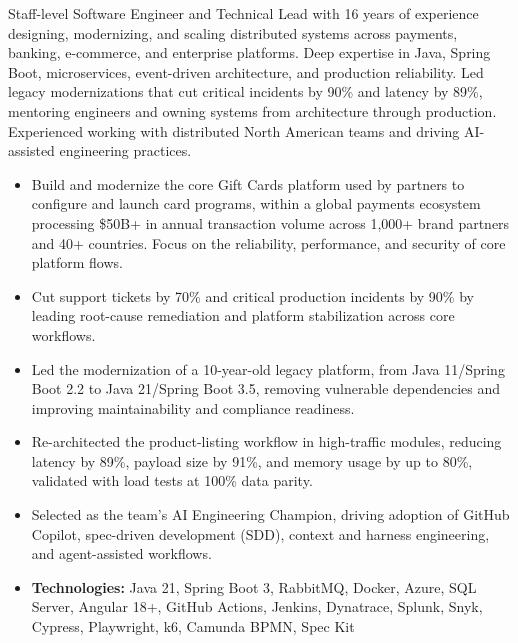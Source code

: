 \documentclass[10pt,a4paper,normalphoto]{altacv}
\newcommand{\techline}[1]{\vspace{3pt}\item[--]{\footnotesize\linespread{0.92}\selectfont \textbf{Technologies:} #1}}
\begin{document}

\makecvheader


Staff-level Software Engineer and Technical Lead with 16 years of experience designing, modernizing, and scaling distributed systems across payments, banking, e-commerce, and enterprise platforms. Deep expertise in Java, Spring Boot, microservices, event-driven architecture, and production reliability. Led legacy modernizations that cut critical incidents by 90\% and latency by 89\%, mentoring engineers and owning systems from architecture through production. Experienced working with distributed North American teams and driving AI-assisted engineering practices.

\medskip


\begin{itemize}
\item[\phantom{{\small\textbullet}}] Build and modernize the core Gift Cards platform used by partners to configure and launch card programs, within a global payments ecosystem processing \$50B+ in annual transaction volume across 1,000+ brand partners and 40+ countries. Focus on the reliability, performance, and security of core platform flows.
\newline
\item Cut support tickets by 70\% and critical production incidents by 90\% by leading root-cause remediation and platform stabilization across core workflows.
\item Led the modernization of a 10-year-old legacy platform, from Java 11/Spring Boot 2.2 to Java 21/Spring Boot 3.5, removing vulnerable dependencies and improving maintainability and compliance readiness.
\item Re-architected the product-listing workflow in high-traffic modules, reducing latency by 89\%, payload size by 91\%, and memory usage by up to 80\%, validated with load tests at 100\% data parity.
\item Selected as the team’s AI Engineering Champion, driving adoption of GitHub Copilot, spec-driven development (SDD), context and harness engineering, and agent-assisted workflows.
\techline{Java 21, Spring Boot 3, RabbitMQ, Docker, Azure, SQL Server, Angular 18+, GitHub Actions, Jenkins, Dynatrace, Splunk, Snyk, Cypress, Playwright, k6, Camunda BPMN, Spec Kit}
\end{itemize}
\divider
\end{document}
